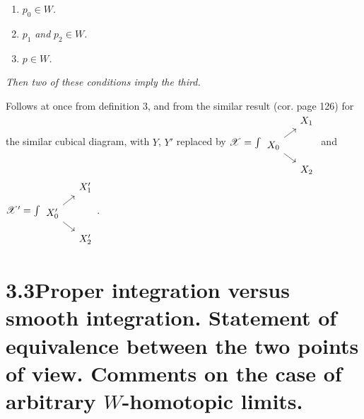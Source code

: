 \documentclass[11pt]{article}
\newcommand{\msp}[1]{\marginpar{\footnotesize [#1]}}
\newcommand{\sX}{\mathscr{X}}
\begin{document}
\msp{page 133}
\begin{enumerate}[label={}]
\item[\textit{a)}] $p_0 \in W$\textit{.}
\item[\textit{b)}] $p_1$ \textit{and} $p_2 \in W$\textit{.}
\item[\textit{c)}] $p \in W$\textit{.}
\end{enumerate}

\textit{Then two of these conditions imply the third.}

Follows at once from definition 3, and from the similar result (cor. page 126) for the similar cubical diagram, with $Y$, $Y'$ replaced by $\sX = \int
\begin{tikzcd}[row sep=small, column sep=small]
 & X_1 \\
X_0 \arrow[ur] \arrow[dr] & \\
 & X_2
\end{tikzcd}$
and $\sX' = \int
\begin{tikzcd}[row sep=small, column sep=small]
 & X'_1 \\
X'_0 \arrow[ur] \arrow[dr] & \\
 & X'_2
\end{tikzcd}$\;.

\section*{3.3\quad Proper integration versus smooth integration. Statement of equivalence between the two points of view. Comments on the case of arbitrary $W$-homotopic limits.}
\end{document}
